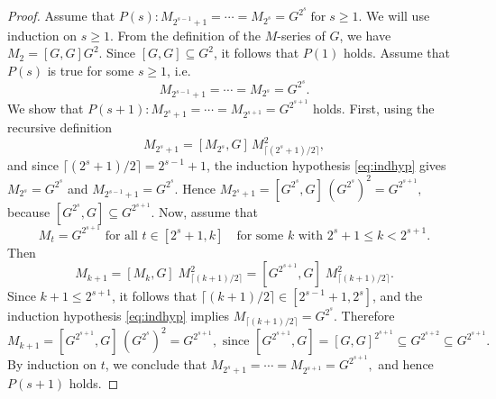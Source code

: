 \documentclass[10pt,a4paper]{amsart}
\begin{document}
\begin{proof} Assume that
$P(s) :  M_{2^{s-1}+1}= \cdots =M_{2^{s}}=G^{2^{s}} \; \text{for} \; s \ge 1.$ We will use induction on $s \ge 1$. From the definition of the $M$-series of $G$, we have $M_2=[G,G]G^2$. Since $[G,G]\subseteq G^2$, it follows that $P(1)$ holds. Assume that $P(s)$ is true for some $s\ge 1$, i.e.
\begin{equation}\label{eq:indhyp}
M_{2^{s-1}+1}=\cdots =M_{2^{s}}=G^{2^{s}}.
\end{equation}
We show that $P(s+1): M_{2^{s}+1}=\cdots=M_{2^{s+1}}=G^{2^{s+1}}$ holds. First, using the recursive definition 
\[
M_{2^s+1}
=[M_{2^s},G]\, M_{\lceil (2^s+1)/2\rceil}^{2},
\]
 and since $\lceil (2^{s}+1)/2\rceil=2^{s-1}+1$, the induction hypothesis
\eqref{eq:indhyp} gives $M_{2^{s}}=G^{2^{s}}$ and $M_{2^{s-1}+1}=G^{2^{s}}$. Hence
$M_{2^{s}+1}
=[G^{2^{s}},G]\,(G^{2^{s}})^{2}
=G^{2^{s+1}},$ because 
$[G^{2^{s}},G]\subseteq G^{2^{s+1}}$. Now, assume that $$M_t=G^{2^{s+1}} \text{ for all } t \in [2^{s}+1, k]\quad \text{for some $k$ with $2^{s}+1\le k<2^{s+1}$}.$$ Then \[
M_{k+1}=[M_k,G]\; M_{\lceil (k+1)/2\rceil}^{2} = [G^{2^{s+1}},G]\; M_{\lceil (k+1)/2\rceil}^{2}.
\]
Since $k+1\le 2^{s+1}$, it follows that $\lceil (k+1)/2\rceil\in[2^{s-1}+1,2^{s}]$, and the induction hypothesis \eqref{eq:indhyp} implies $M_{\lceil (k+1)/2\rceil}=G^{2^{s}}$. Therefore
\[
M_{k+1} = [G^{2^{s+1}},G]\,(G^{2^{s}})^2 = G^{2^{s+1}}, \text{ since $[G^{2^{s+1}},G]=[G,G]^{2^{s+1}}\subseteq G^{2^{s+2}}\subseteq G^{2^{s+1}}.$}
\] By induction on $t$, we conclude that 
$M_{2^{s}+1}=\cdots=M_{2^{s+1}}=G^{2^{s+1}},$ and hence $P(s+1)$ holds.
\end{proof}
\end{document}
